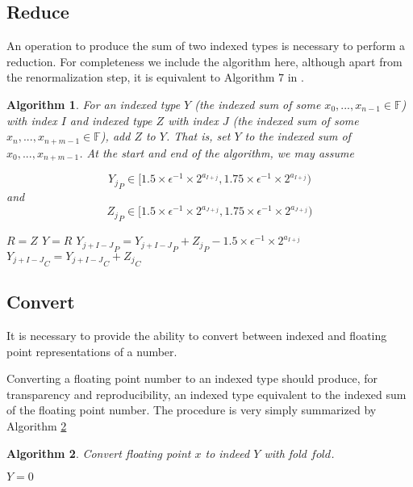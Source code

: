 \documentclass[12pt]{article}
\providecommand{\F}{\ensuremath{\mathbb{F}}}
\providecommand{\To}{\ensuremath{\text{ to }}}
\theoremstyle{plain}
\newtheorem{alg}{Algorithm}[section]
\numberwithin{equation}{section}
\begin{document}
  \subsection{Reduce}
    An operation to produce the sum of two indexed types is necessary to perform a reduction. For completeness we include the algorithm here, although apart from the renormalization step, it is equivalent to Algorithm $7$ in \cite{repsum}.
    \begin{alg}
      For an indexed type $Y$ (the indexed sum of some $x_0, ..., x_{n - 1} \in \F$) with index $I$ and indexed type $Z$ with index $J$ (the indexed sum of some $x_n, ..., x_{n + m - 1} \in \F$), add $Z$ to $Y$. That is, set $Y$ to the indexed sum of $x_0, ..., x_{n + m - 1}$. At the start and end of the algorithm, we may assume

    \begin{equation*}
      {Y_j}_P \in [1.5 \times \epsilon^{-1}\times 2^{a_{I + j}}, 1.75 \times \epsilon^{-1}\times 2^{a_{I + j}})
    \end{equation*}
    and
    \begin{equation*}
      {Z_j}_P \in [1.5 \times \epsilon^{-1}\times 2^{a_{J + j}}, 1.75 \times \epsilon^{-1}\times 2^{a_{J + j}})
    \end{equation*}
      \begin{algorithmic}[1]
            \State $R = Z$
            \State {}
            \State $Y = R$
          \EndIf
          \For{$j = 0 \To J$}
            \State ${Y_{j + I - J}}_P = {Y_{j + I - J}}_P + {Z_j}_P - 1.5 \times \epsilon^{-1} \times 2^{a_{I + j}}$
            \State ${Y_{j + I - J}}_C = {Y_{j + I - J}}_C + {Z_j}_C$
          \EndFor
          \State {}
        \EndFunction
      \end{algorithmic}
      \label{alg:reduce}
    \end{alg}

  \subsection{Convert}
    \label{sec:convert}
    It is necessary to provide the ability to convert between indexed and floating point representations of a number.

    Converting a floating point number to an indexed type should produce, for transparency and reproducibility, an indexed type equivalent to the indexed sum of the floating point number.
    The procedure is very simply summarized by Algorithm \ref{alg:conv2indexed}
    \begin{alg}
      Convert floating point $x$ to indeed $Y$ with fold $fold$.
      \begin{algorithmic}[1]
          \State $Y = 0$
          \State {}
          \State {}
          \State {}
        \EndFunction
      \end{algorithmic}
      \label{alg:conv2indexed}
    \end{alg}
\end{document}
